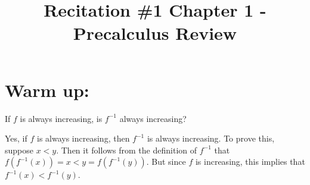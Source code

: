 \documentclass[handout,nooutcomes]{ximera}
\title{Recitation \#1 Chapter 1 - Precalculus Review}
\begin{document}
\begin{abstract}		\end{abstract}
\maketitle

\section*{Warm up:}
   
If $f$ is always increasing, is $f^{-1}$ always increasing?

			 \begin{freeResponse}
			 
			Yes, if $f$ is always increasing, then $f^{-1}$ is always increasing.  To prove this, suppose $x < y$.  Then it follows from the definition of $f^{-1}$ that $f(f^{-1}(x)) = x < y =  f(f^{-1}(y))$.  But since $f$ is increasing, this implies that $f^{-1}(x)  < f^{-1}(y)$.
	
			\end{freeResponse}
\end{document}
